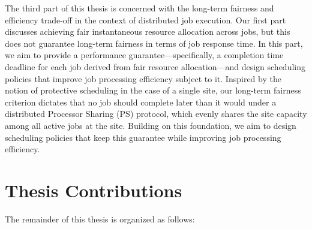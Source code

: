 The third part of this thesis is concerned with the long-term fairness and efficiency trade-off in the context of distributed job execution. Our first part discusses achieving fair instantaneous resource allocation across jobs, but this does not guarantee long-term fairness in terms of job response time. In this part, we aim to provide a performance guarantee—specifically, a completion time deadline for each job derived from fair resource allocation—and design scheduling policies that improve job processing efficiency subject to it. Inspired by the notion of protective scheduling in the case of a single site, our long-term fairness criterion dictates that no job should complete later than it would under a distributed Processor Sharing (PS) protocol, which evenly shares the site capacity among all active jobs at the site. Building on this foundation, we aim to design scheduling policies that keep this guarantee while improving job processing efficiency. %

\section{Thesis Contributions}
The remainder of this thesis is organized as follows:

